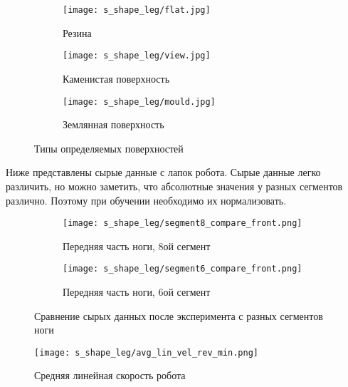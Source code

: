 \begin{figure}[H]
    \begin{subfigure}[t]{0.3\textwidth}
        \centering\texttt{[image: s\_shape\_leg/flat.jpg]}
        \caption{Резина}
        \label{fig:s_shape_leg/flat.jpg}
    \end{subfigure}
    \hfill
    \begin{subfigure}[t]{0.3\textwidth}
        \centering\texttt{[image: s\_shape\_leg/view.jpg]}
        \caption{Каменистая поверхность}
        \label{fig:s_shape_leg/view.jpg}
    \end{subfigure}
    \begin{subfigure}[t]{0.3\textwidth}
        \centering\texttt{[image: s\_shape\_leg/mould.jpg]}
        \caption{Землянная поверхность}
        \label{fig:s_shape_leg/mould.jpg}
    \end{subfigure}
    \caption{Типы определяемых поверхностей}
\end{figure}

Ниже  представлены сырые данные с лапок робота. Сырые данные легко различить, но можно заметить, что абсолютные значения у разных сегментов различно. Поэтому при обучении необходимо их нормализовать.

\begin{figure}[H]
    \begin{subfigure}[t]{0.9\textwidth}
        \centering\texttt{[image: s\_shape\_leg/segment8\_compare\_front.png]}
        \caption{Передняя часть ноги, 8ой сегмент}
    \end{subfigure}

    \begin{subfigure}[t]{0.9\textwidth}
        \centering\texttt{[image: s\_shape\_leg/segment6\_compare\_front.png]}
        \caption{Передняя часть ноги, 6ой сегмент}
    \end{subfigure}
    \caption{Сравнение сырых данных после эксперимента с разных сегментов ноги}
    \label{fig:data_from_legs}
\end{figure}

\begin{figure}[H]
    \centering\texttt{[image: s\_shape\_leg/avg\_lin\_vel\_rev\_min.png]}
    \caption{Средняя линейная скорость робота}
    \label{fig:s_shape_leg/AverageVelocity (1).png}
\end{figure}

